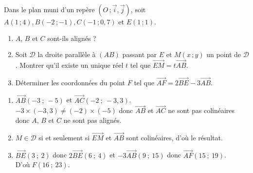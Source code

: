 \begin{autoeval}
\begin{multicols}{2}
    \begin{exercice}
      Dans le plan muni d'un repère $(O\,;\vec{i},\vec{j})$, soit
      $A(1\,;4), B(-2\,;-1), C(-1\,;0,7)$ et $E(1\,;1)$.
      \begin{enumerate}
      \item $A$, $B$ et $C$ sont-ils alignés ?
      \item Soit $\mathscr{D}$ la droite parallèle à $(AB)$ passant
        par $E$ et $M(x\,;y)$ un point de $\mathscr{D}$. Montrer qu'il
        existe un unique réel $t$ tel que
        $\overrightarrow{EM}=t \overrightarrow{AB}$.
      \item Déterminer les coordonnées du point $F$ tel que
        $\overrightarrow{AF}=2 \overrightarrow{BE}-3
        \overrightarrow{AB}$.
      \end{enumerate}
    \end{exercice}
    \begin{corrige}
      \begin{enumerate}
      \item $\overrightarrow{AB}(-3\ ;\ -5)$ et $\overrightarrow{AC}(-2\ ;\ -3{,}3)$.\\
        $-3\times(-3,3)\neq(-2)\times(-5)$ donc $\overrightarrow{AB}$
        et $\overrightarrow{AC}$ ne sont pas colinéaires donc $A$, $B$
        et $C$ ne sont pas alignés.
      \item $M\in\mathscr{D}$ si et seulement si
        $ \overrightarrow{EM}$ et $\overrightarrow{AB}$ sont
        colinéaires, d'où le résultat.
      \item $\overrightarrow{BE}(3\ ;\ 2)$ donc $2\overrightarrow{BE}(6\ ;\ 4)$ et $-3\overrightarrow{AB}(9\ ;\ 15)$ donc $\overrightarrow{AF}(15\ ;\ 19)$.\\
        D'où $F(16\ ;\ 23)$.
      \end{enumerate}
    \end{corrige}


\end{multicols}
\end{autoeval}
